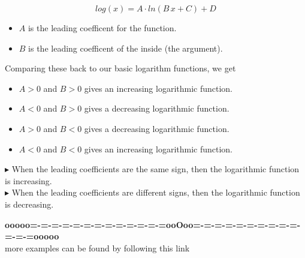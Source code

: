 \documentclass{ximera}
\begin{document}
\[
log(x) = A \cdot ln(B \, x + C) + D
\]


\begin{itemize}
  \item $A$ is the leading coefficent for the function.
  \item $B$ is the leading coefficent of the inside (the argument).
\end{itemize}


Comparing these back to our basic logarithm functions, we get



\begin{itemize}
  \item $A > 0$ and $B > 0$ gives an increasing logarithmic function.
  \item $A < 0$ and $B > 0$ gives a decreasing logarithmic function.
  \item $A > 0$ and $B < 0$ gives a decreasing logarithmic function.
  \item $A < 0$ and $B < 0$ gives an increasing logarithmic function.
\end{itemize}


$\blacktriangleright$ When the leading coefficients are the same sign, then the logarithmic function is increasing. \\

$\blacktriangleright$ When the leading coefficients are different signs, then the logarithmic function is decreasing. \\























\begin{center}
\textbf{\textcolor{green!50!black}{ooooo=-=-=-=-=-=-=-=-=-=-=-=-=ooOoo=-=-=-=-=-=-=-=-=-=-=-=-=ooooo}} \\

more examples can be found by following this link\\ 

\end{center}
\end{document}
